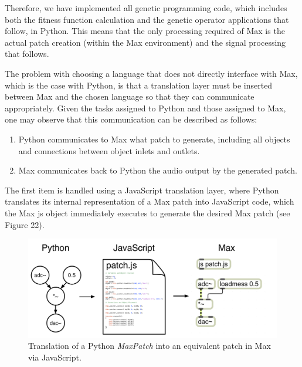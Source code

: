 \documentclass[12pt]{report} 	%
\numberwithin{figure}{chapter}
\numberwithin{table}{chapter}
\numberwithin{equation}{chapter}
\begin{document}
\begin{flushleft}
Therefore, we have implemented all genetic programming code, which includes both the fitness function calculation and the genetic operator applications that follow, in Python. This means that the only processing required of Max is the actual patch creation (within the Max environment) and the signal processing that follows.

The problem with choosing a language that does not directly interface with Max, which is the case with Python, is that a translation layer must be inserted between Max and the chosen language so that they can communicate appropriately. Given the tasks assigned to Python and those assigned to Max, one may observe that this communication can be described as follows:
\begin{enumerate}
\item Python communicates to Max what patch to generate, including all objects and connections between object inlets and outlets. 
\item Max communicates back to Python the audio output by the generated patch.
\end{enumerate}

The first item is handled using a JavaScript translation layer, where Python translates its internal representation of a Max patch into JavaScript code, which the Max js object immediately executes to generate the desired Max patch (see Figure 22). 
\begin{figure}[h!]
\begin{center}
\includegraphics[scale=0.4]{JSTranslation}
\caption[Generating a Max patch given a Python tree]{Translation of a Python \textit{MaxPatch} into an equivalent patch in Max via JavaScript.}
\end{center}
\end{figure}


\end{flushleft}
\end{document}
